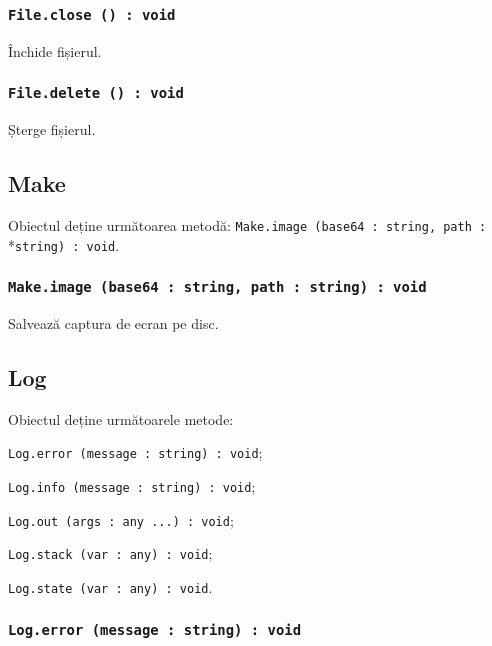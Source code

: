 \subsubsection{\texttt{File.close () : void}}

Închide fișierul.

\subsubsection{\texttt{File.delete () : void}}

Șterge fișierul.

\subsection{{\color{orange} Make}}

Obiectul \make{} deține următoarea metodă: \texttt{Make.image (base64 : string, path :}\\*\texttt{string) : void}.

\subsubsection{\texttt{Make.image (base64 : string, path : string) : void}}

Salvează captura de ecran pe disc.

\subsection{{\color{orange} Log}}

Obiectul \logtype{} deține următoarele metode:
\begin{icItems}
	\item \texttt{Log.error (message : string) : void};
	\item \texttt{Log.info (message : string) : void};
	\item \texttt{Log.out (args : any ...) : void};
	\item \texttt{Log.stack (var : any) : void};
	\item \texttt{Log.state (var : any) : void}.
\end{icItems}

\subsubsection{\texttt{Log.error (message : string) : void}}

